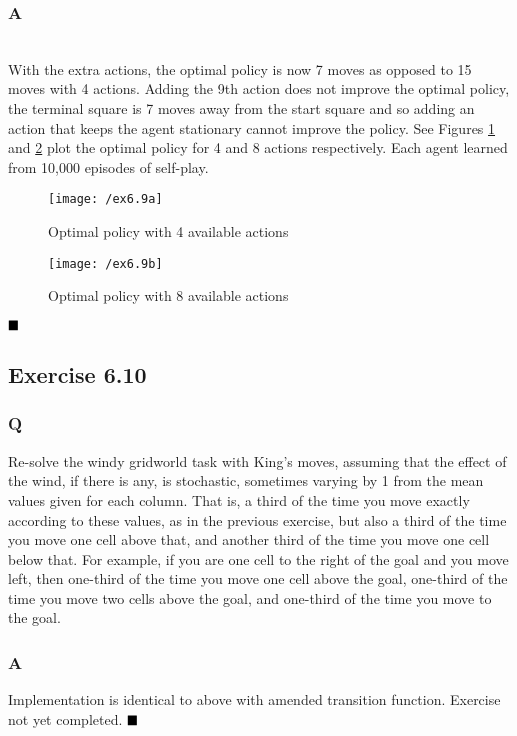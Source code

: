 \subsubsection{A}
\ProgrammingExercise \\

With the extra actions, the optimal policy is now 7 moves as opposed to 15 moves with 4 actions. Adding the 9th action does not improve the optimal policy, the terminal square is 7 moves away from the start square and so adding an action that keeps the agent stationary cannot improve the policy. See Figures \ref{fig:ex6.9a} and \ref{fig:ex6.9b} plot the optimal policy for 4 and 8 actions respectively. Each agent learned from 10,000 episodes of self-play.
\begin{figure}[h!]
	\centering
	\texttt{[image: /ex6.9a]}
	\caption{Optimal policy with 4 available actions}
	\label{fig:ex6.9a}
\end{figure}
\begin{figure}[h!]
	\centering
	\texttt{[image: /ex6.9b]}
	\caption{Optimal policy with 8 available actions}
	\label{fig:ex6.9b}
\end{figure}
$
\hfill \blacksquare
$

\subsection{Exercise 6.10}
\subsubsection{Q}
Re-solve the windy gridworld task with King’s moves, assuming that the effect of the wind, if there is any, is stochastic, sometimes varying by 1 from the mean values given for each column. That is, a third of the time you move exactly according to these values, as in the previous exercise, but also a third of the time you move one cell above that, and another third of the time you move one cell below that. For example, if you are one cell to the right of the goal and you move left, then one-third of the time you move one cell above the goal, one-third of the time you move two cells above the goal, and one-third of the time you move to the goal.
\subsubsection{A}
Implementation is identical to above with amended transition function. Exercise not yet completed.
$
\hfill \blacksquare
$

